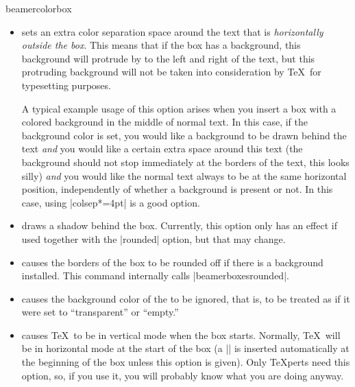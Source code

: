 \begin{environment}{{beamercolorbox}}
\begin{itemize}
  \item
     sets an extra color separation space around the text that is \emph{horizontally outside the box}. This means that if the box has a background, this background will protrude by  to the left and right of the text, but this protruding background will not be taken into consideration by \TeX\ for typesetting purposes.

    A typical example usage of this option arises when you insert a box with a colored background in the middle of normal text. In this case, if the background color is set, you would like a background to be drawn behind the text \emph{and} you would like a certain extra space around this text (the background should not stop immediately at the borders of the text, this looks silly) \emph{and} you would like the normal text always to be at the same horizontal position, independently of whether a background is present or not. In this case, using |colsep*=4pt| is a good option.
  \item
     draws a shadow behind the box. Currently, this option only has an effect if used together with the |rounded| option, but that may change.
  \item
     causes the borders of the box to be rounded off if there is a background installed. This command internally calls |beamerboxesrounded|.
  \item
     causes the background color of the  to be ignored, that is, to be treated as if it were set to ``transparent'' or ``empty.''
  \item
     causes \TeX\ to be in vertical mode when the box starts. Normally, \TeX\ will be in horizontal mode at the start of the box (a |\leavevmode| is inserted automatically at the beginning of the box unless this option is given). Only \TeX perts need this option, so, if you use it, you will probably know what you are doing anyway.
  \end{itemize}
\end{environment}

